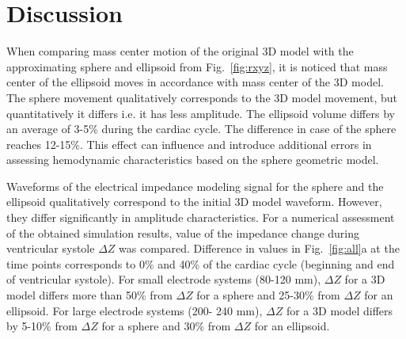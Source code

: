 \documentclass[conference]{IEEEtran}
\begin{document}
\section{Discussion}

When comparing mass center motion of the original 3D model with the approximating sphere and ellipsoid from Fig.~\ref{fig:rxyz},
it is noticed that mass center of the ellipsoid moves in accordance with mass center of the 3D model.
The sphere movement qualitatively corresponds to the 3D model movement, but quantitatively it differs i.e. it has less amplitude.
The ellipsoid volume differs by an average of 3-5\% during the cardiac cycle.
The difference in case of the sphere reaches 12-15\%.
This effect can influence and introduce additional errors in assessing hemodynamic characteristics based on the sphere geometric model.


Waveforms of the electrical impedance modeling signal for the sphere and the ellipsoid qualitatively correspond to the initial 3D model waveform.
However, they differ significantly in amplitude characteristics.
For a numerical assessment of the obtained simulation results, value of the impedance change during ventricular systole $ \Delta Z $ was compared.
Difference in values in Fig.~\ref{fig:all}a at the time points corresponds to 0\% and 40\% of the cardiac cycle (beginning and end of ventricular systole).
For small electrode systems (80-120 mm), $\Delta Z$ for a 3D model differs more than 50\% from $\Delta Z$ for a sphere and 25-30\% from $\Delta Z$ for an ellipsoid.
For large electrode systems (200- 240 mm), $\Delta Z$ for a 3D model differs by 5-10\% from $\Delta Z$ for a sphere and 30\% from $\Delta Z$ for an ellipsoid.
\end{document}
